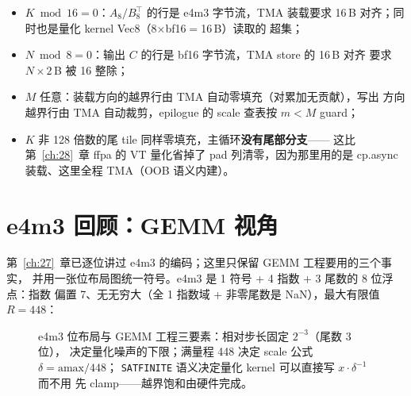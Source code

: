 \begin{itemize}[itemsep=1pt,topsep=2pt]
  \item $K \bmod 16 = 0$：$A_8/B_8^{\top}$ 的行是 e4m3 字节流，TMA 装载要求
        16\,B 对齐；同时也是量化 kernel Vec8（8$\times$bf16$=$16\,B）读取的
        超集；
  \item $N \bmod 8 = 0$：输出 $C$ 的行是 bf16 字节流，TMA store 的 16\,B 对齐
        要求 $N\times 2$\,B 被 16 整除；
  \item $M$ 任意：装载方向的越界行由 TMA 自动零填充（对累加无贡献），写出
        方向越界行由 TMA 自动裁剪，epilogue 的 scale 查表按 $m<M$ guard；
  \item $K$ 非 128 倍数的尾 tile 同样零填充，主循环\textbf{没有尾部分支}——
        这比第~\ref{ch:28}~章 ffpa 的 VT 量化省掉了 pad 列清零，因为那里用的是
        cp.async 装载、这里全程 TMA（OOB 语义内建）。
\end{itemize}

\section{e4m3 回顾：GEMM 视角}\label{sec:34-e4m3}

第~\ref{ch:27}~章已逐位讲过 e4m3 的编码；这里只保留 GEMM 工程要用的三个事实，
并用一张位布局图统一符号。e4m3 是 1 符号 + 4 指数 + 3 尾数的 8 位浮点：指数
偏置 7、无无穷大（全 1 指数域 + 非零尾数是 NaN），最大有限值 $R=448$：

\begin{figure}[H]
\centering
{}
\caption{e4m3 位布局与 GEMM 工程三要素：相对步长固定 $2^{-3}$（尾数 3 位），
决定量化噪声的下限；满量程 448 决定 scale 公式 $\delta=\mathrm{amax}/448$；
\texttt{SATFINITE} 语义决定量化 kernel 可以直接写 $x\cdot\delta^{-1}$ 而不用
先 clamp——越界饱和由硬件完成。}
\label{fig:34-e4m3}
\end{figure}

